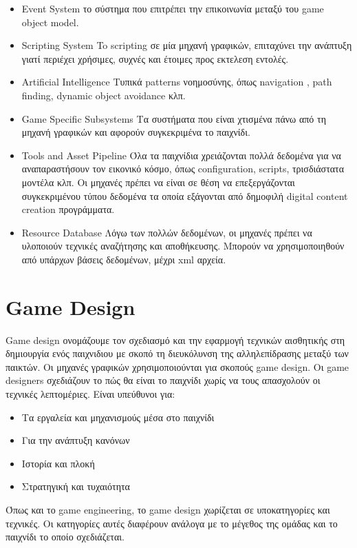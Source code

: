 \begin{itemize}
\item Event System
το σύστημα που επιτρέπει την επικοινωνία μεταξύ του game object model.
\item Scripting System
To scripting σε μία μηχανή γραφικών, επιταχύνει την ανάπτυξη γιατί περιέχει χρήσιμες, συχνές και έτοιμες προς εκτελεση εντολές.
\item Artificial Intelligence
Τυπικά patterns νοημοσύνης, όπως navigation , path finding, dynamic object avoidance κλπ.
\item Game Specific Subsystems
Τα συστήματα που είναι χτισμένα πάνω από τη μηχανή γραφικών και αφορούν συγκεκριμένα το παιχνίδι.
\item Tools and Asset Pipeline
Όλα τα παιχνίδια χρειάζονται πολλά δεδομένα για να αναπαραστήσουν τον εικονικό κόσμο, όπως configuration, scripts, τρισδιάστατα μοντέλα κλπ. Οι μηχανές πρέπει να είναι σε θέση να επεξεργάζονται συγκεκριμένου τύπου δεδομένα τα οποία εξάγονται από δημοφιλή digital content creation προγράμματα.
\item Resource Database
Λόγω των πολλών δεδομένων, οι μηχανές πρέπει να υλοποιούν τεχνικές αναζήτησης και αποθήκευσης. Μπορούν να χρησιμοποιηθούν από υπάρχων βάσεις δεδομένων, μέχρι xml αρχεία. 
\end{itemize}

\section{Game Design}
Game design ονομάζουμε τον σχεδιασμό και την εφαρμογή τεχνικών αισθητικής στη δημιουργία ενός παιχνιδιου με σκοπό τη διευκόλυνση της αλληλεπίδρασης μεταξύ των παικτών. Οι μηχανές γραφικών χρησιμοποιούνται για σκοπούς game design. Οι game designers σχεδιάζουν το πώς θα είναι το παιχνίδι χωρίς να τους απασχολούν οι τεχνικές λεπτομέριες. Είναι υπεύθυνοι για:
\begin{itemize}
	\item Τα εργαλεία και μηχανισμούς μέσα στο παιχνίδι
	\item Για την ανάπτυξη κανόνων
	\item Ιστορία και πλοκή
	\item Στρατηγική και τυχαιότητα	
\end{itemize}

Όπως και το game engineering, το game design χωρίζεται σε υποκατηγορίες και τεχνικές. Οι κατηγορίες αυτές διαφέρουν ανάλογα με το μέγεθος της ομάδας και το παιχνίδι το οποίο σχεδιάζεται.
